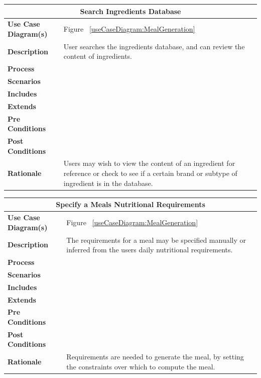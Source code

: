 \documentclass[12pt]{article}
\begin{document}
\begin{center}
\begin{tabularx}{\textwidth}{ |X|X|}
\hline
\multicolumn{2}{|c|}{\textbf{Search Ingredients Database}}\\
\hline
\hline
\textbf{Use Case Diagram(s)} & Figure ~\ref{useCaseDiagram:MealGeneration} \\ \hline
\textbf{Description} & User searches the ingredients database, and can review the content of ingredients.\\ \hline
\textbf{Process} & \\ \hline
\textbf{Scenarios} & \\ \hline
\textbf{Includes} & \\ \hline
\textbf{Extends} &  \\ \hline
\textbf{Pre Conditions} & \\ \hline
\textbf{Post Conditions} & \\ \hline
\textbf{Rationale} & Users may wish to view the content of an ingredient for reference or check to see if a certain brand or subtype of ingredient is in the database.\\ \hline
\end{tabularx}
\end{center}

\begin{center}
\begin{tabularx}{\textwidth}{ |X|X|}
\hline
\multicolumn{2}{|c|}{\textbf{Specify a Meals Nutritional Requirements}}\\
\hline
\hline
\textbf{Use Case Diagram(s)} & Figure ~\ref{useCaseDiagram:MealGeneration} \\ \hline
\textbf{Description} & The requirements for a meal may be specified manually or inferred from the users daily nutritional requirements.\\ \hline
\textbf{Process} & \\ \hline
\textbf{Scenarios} & \\ \hline
\textbf{Includes} & \\ \hline
\textbf{Extends} &  \\ \hline
\textbf{Pre Conditions} & \\ \hline
\textbf{Post Conditions} & \\ \hline
\textbf{Rationale} & Requirements are needed to generate the meal, by setting the constraints over which to compute the meal.\\ \hline
\end{tabularx}
\end{center}
\end{document}
